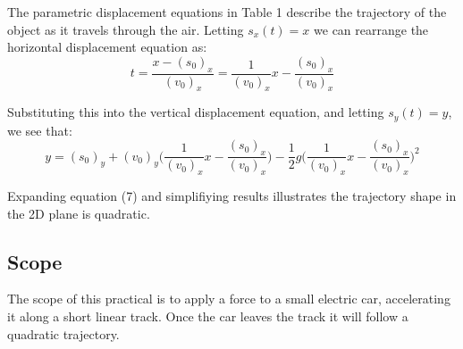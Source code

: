 \documentclass[a4paper]{article}
\begin{document}
The parametric displacement equations in Table 1 describe the trajectory of the object as it travels through the air. Letting $s_x(t) = x$ we can rearrange the horizontal displacement equation as:
\begin{equation}
t = \frac{x - (s_0)_x}{(v_0)_x} = \frac{1}{(v_0)_x}x - \frac{(s_0)_x}{(v_0)_x}
\end{equation}

Substituting this into the vertical displacement equation, and letting $s_y(t) = y$, we see that:
\begin{equation}
y = (s_0)_y + (v_0)_y \bigg(\frac{1}{(v_0)_x}x - \frac{(s_0)_x}{(v_0)_x} \bigg) -\frac{1}{2}g \bigg(\frac{1}{(v_0)_x}x - \frac{(s_0)_x}{(v_0)_x} \bigg)^2
\end{equation}

Expanding equation (7) and simplifiying results illustrates the trajectory shape in the 2D plane is quadratic.


\subsection{Scope}
The scope of this practical is to apply a force to a small electric car, accelerating it along a short linear track. Once the car leaves the track it will follow a quadratic trajectory.

\newpage
\end{document}
